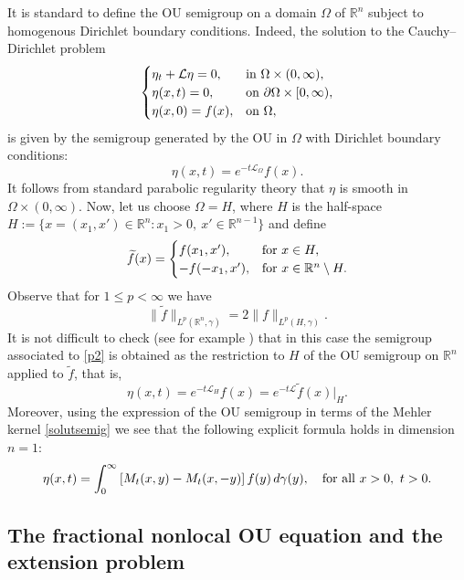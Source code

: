 \documentclass[a4paper,10pt,reqno]{amsart}
\newcommand{\R}{\mathbb{R}}
\numberwithin{equation}{section}
\begin{document}
It is standard to define the OU semigroup on a domain $\Omega$ of $\R^{n}$
subject to homogenous Dirichlet boundary conditions. Indeed, the solution to
the Cauchy--Dirichlet problem
\begin{equation} \label{p2}
\begin{cases}
\eta_{t}+\mathcal{L}\eta=0,&\hbox{in}~\Omega\times(0,\infty), \\
\eta(x,t)=0,&\hbox{on}~\partial\Omega\times[0,\infty), \\
\eta(x,0)=f(x),&\hbox{on}~\Omega,
\end{cases}
\end{equation}
is given by the semigroup generated by the OU in $\Omega$ with Dirichlet boundary conditions:
$$\eta(x,t)=e^{-t\mathcal{L}_{\Omega}}f(x).$$
It follows from standard parabolic regularity theory that $\eta$ is smooth in $\Omega\times(0,\infty)$.
Now, let us choose $\Omega=H$, where $H$ is the half-space $H:=\{x=(x_{1},x')\in\R^n :x_{1}>0,~x'\in\R^{n-1}\}$
and define
\begin{equation}\label{est1}
\widetilde{f}(x)=
\begin{cases}
f(x_{1},x^{\prime}),&\hbox{for}~x\in H,\\
-f(-x_{1},x^{\prime}),&\hbox{for}~x\in\R^n\setminus H.
\end{cases}
\end{equation}
Observe that for $1\leq p<\infty$ we have
\begin{equation}\label{norma prolungamento}
\|\widetilde{f}\|_{L^p(\R^n,\gamma)}=2\|f\|_{L^{p}(H,\gamma)}.
\end{equation}
It is not difficult to check (see for example \cite{Priola}) that in this case
the semigroup associated to \eqref{p2} is obtained as the restriction to $H$
of the OU semigroup on $\R^n$ applied to $\tilde{f}$, that is,
\begin{equation}\label{eta}
\eta(x,t)=e^{-t\mathcal{L}_H}f(x)=e^{-t\mathcal{L}}\widetilde{f}(x)\big|_H.
\end{equation}
Moreover, using the expression of the OU semigroup in terms of the Mehler kernel \eqref{solutsemig}
we see that the following explicit formula holds in dimension $n=1$:
\begin{equation}\label{eq:eta}
\eta(x,t)=\int_{0}^{\infty}\left[M_{t}(x,y)-M_{t}(x,-y)\right]f(y)\,d\gamma(y),
\quad\hbox{for all}~x>0,~t>0.
\end{equation}

\subsection{The fractional nonlocal OU equation and the extension problem}
\end{document}
